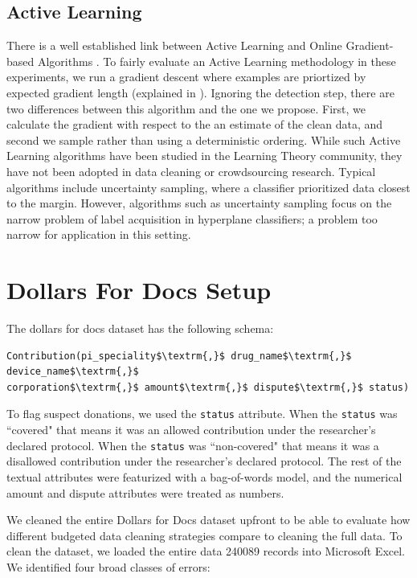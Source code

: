 \subsection{Active Learning}\label{al}
There is a well established link between Active Learning and Online Gradient-based Algorithms \cite{guillory2009active}. 
To fairly evaluate an Active Learning methodology in these experiments, we run a gradient descent where examples are priortized by expected gradient length (explained in \cite{settles2010active}).
Ignoring the detection step, there are two differences between this algorithm and the one we propose.
First, we calculate the gradient with respect to the an estimate of the clean data, and second we sample rather than using a deterministic ordering.
While such Active Learning algorithms have been studied in the Learning Theory community, they have not been adopted in data cleaning or crowdsourcing research.
Typical algorithms include uncertainty sampling, where a classifier prioritized data closest to the margin.
However, algorithms such as uncertainty sampling focus on the narrow problem of label acquisition in hyperplane classifiers; a problem too narrow for application in this setting.

\section{Dollars For Docs Setup}\label{dfd-errors}
The dollars for docs dataset has the following schema:
\begin{lstlisting}[mathescape,basicstyle={\scriptsize}]
Contribution(pi_speciality$\textrm{,}$ drug_name$\textrm{,}$ device_name$\textrm{,}$
corporation$\textrm{,}$ amount$\textrm{,}$ dispute$\textrm{,}$ status)
\end{lstlisting}
To flag suspect donations, we used the \texttt{status} attribute.
When the \texttt{status} was ``covered" that means it was an allowed contribution under the researcher's declared protocol.
When the \texttt{status} was ``non-covered" that means it was a disallowed contribution under the researcher's declared protocol.
The rest of the textual attributes were featurized with a bag-of-words model, and the numerical amount and dispute attributes were treated as numbers.

We cleaned the entire Dollars for Docs dataset upfront to be able to evaluate how different budgeted data cleaning strategies compare to cleaning the full data.
To clean the dataset, we loaded the entire data 240089 records into Microsoft Excel. We identified four broad classes of errors:
\vspace{0.25em}

